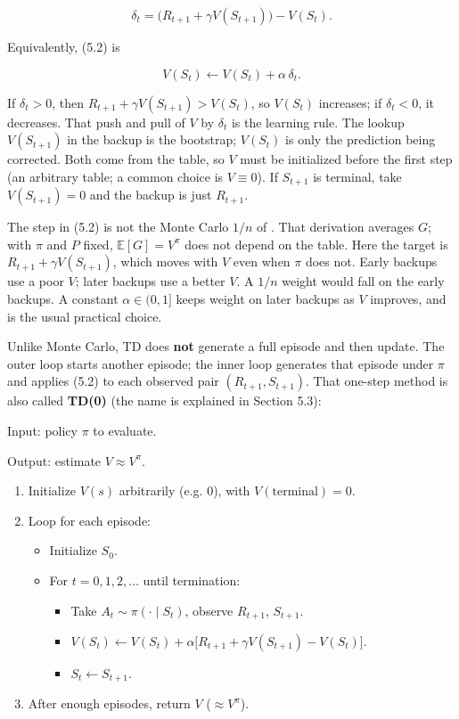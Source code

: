 \begin{equation}
\delta_t
=
\bigl(R_{t+1}+\gamma V(S_{t+1})\bigr) - V(S_t).
\tag{5.3}
\end{equation}

Equivalently, (5.2) is

\[
V(S_t)
\leftarrow
V(S_t)+\alpha\,\delta_t.
\]

If $\delta_t>0$, then $R_{t+1}+\gamma V(S_{t+1})>V(S_t)$, so $V(S_t)$ increases; if $\delta_t<0$, it decreases. That push and pull of $V$ by $\delta_t$ is the learning rule. The lookup $V(S_{t+1})$ in the backup is the bootstrap; $V(S_t)$ is only the prediction being corrected. Both come from the table, so $V$ must be initialized before the first step (an arbitrary table; a common choice is $V\equiv 0$). If $S_{t+1}$ is terminal, take $V(S_{t+1})=0$ and the backup is just $R_{t+1}$.

The step in (5.2) is not the Monte Carlo $1/n$ of . That derivation averages $G$; with $\pi$ and $P$ fixed, $\mathbb{E}[G]=V^\pi$ does not depend on the table. Here the target is $R_{t+1}+\gamma V(S_{t+1})$, which moves with $V$ even when $\pi$ does not. Early backups use a poor $V$; later backups use a better $V$. A $1/n$ weight would fall on the early backups. A constant $\alpha\in(0,1]$ keeps weight on later backups as $V$ improves, and is the usual practical choice.

Unlike Monte Carlo, TD does \textbf{not} generate a full episode and then update. The outer loop starts another episode; the inner loop generates that episode under $\pi$ and applies (5.2) to each observed pair $(R_{t+1},S_{t+1})$. That one-step method is also called \textbf{TD(0)} (the name is explained in Section 5.3):

\begin{implnote}
Input: policy $\pi$ to evaluate.

Output: estimate $V\approx V^\pi$.

\begin{enumerate}
\item Initialize $V(s)$ arbitrarily (e.g. $0$), with $V(\text{terminal})=0$.
\item Loop for each episode:
\begin{itemize}
\item Initialize $S_0$.
\item For $t=0,1,2,\ldots$ until termination:
\begin{itemize}
\item Take $A_t\sim\pi(\cdot\mid S_t)$, observe $R_{t+1}$, $S_{t+1}$.
\item $V(S_t)\leftarrow V(S_t)+\alpha\bigl[R_{t+1}+\gamma V(S_{t+1})-V(S_t)\bigr]$.
\item $S_t\leftarrow S_{t+1}$.
\end{itemize}
\end{itemize}
\item After enough episodes, return $V$ ($\approx V^\pi$).
\end{enumerate}

\end{implnote}

